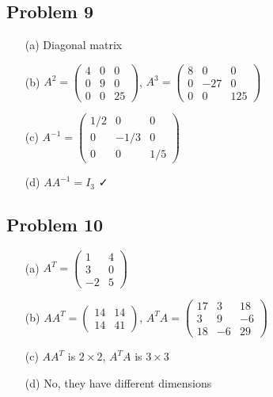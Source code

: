\documentclass[11pt]{article}
\begin{document}
\subsection*{Problem 9}
\begin{enumerate}
\item[(a)] Diagonal matrix
\item[(b)] $A^2 = \begin{pmatrix} 4 & 0 & 0 \\ 0 & 9 & 0 \\ 0 & 0 & 25 \end{pmatrix}$, $A^3 = \begin{pmatrix} 8 & 0 & 0 \\ 0 & -27 & 0 \\ 0 & 0 & 125 \end{pmatrix}$
\item[(c)] $A^{-1} = \begin{pmatrix} 1/2 & 0 & 0 \\ 0 & -1/3 & 0 \\ 0 & 0 & 1/5 \end{pmatrix}$
\item[(d)] $AA^{-1} = I_3$ ✓
\end{enumerate}

\subsection*{Problem 10}
\begin{enumerate}
\item[(a)] $A^T = \begin{pmatrix} 1 & 4 \\ 3 & 0 \\ -2 & 5 \end{pmatrix}$
\item[(b)] $AA^T = \begin{pmatrix} 14 & 14 \\ 14 & 41 \end{pmatrix}$, $A^T A = \begin{pmatrix} 17 & 3 & 18 \\ 3 & 9 & -6 \\ 18 & -6 & 29 \end{pmatrix}$
\item[(c)] $AA^T$ is $2 \times 2$, $A^T A$ is $3 \times 3$
\item[(d)] No, they have different dimensions
\end{enumerate}
\end{document}

